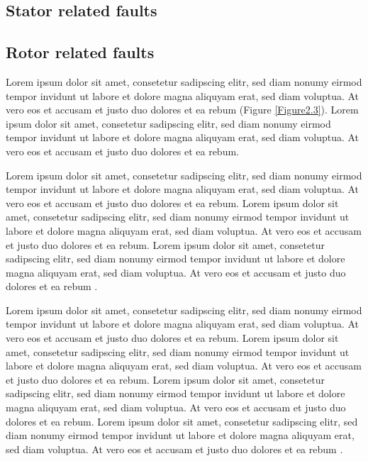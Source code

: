\subsection{Stator related faults}
\subsection{Rotor related faults}

Lorem ipsum dolor sit amet, consetetur sadipscing elitr, sed diam nonumy eirmod tempor invidunt ut labore et dolore magna aliquyam erat, sed diam voluptua. At vero eos et accusam et justo duo dolores et ea rebum (Figure \ref{Figure2.3}). Lorem ipsum dolor sit amet, consetetur sadipscing elitr, sed diam nonumy eirmod tempor invidunt ut labore et dolore magna aliquyam erat, sed diam voluptua. At vero eos et accusam et justo duo dolores et ea rebum. 

Lorem ipsum dolor sit amet, consetetur sadipscing elitr, sed diam nonumy eirmod tempor invidunt ut labore et dolore magna aliquyam erat, sed diam voluptua. At vero eos et accusam et justo duo dolores et ea rebum. Lorem ipsum dolor sit amet, consetetur sadipscing elitr, sed diam nonumy eirmod tempor invidunt ut labore et dolore magna aliquyam erat, sed diam voluptua. At vero eos et accusam et justo duo dolores et ea rebum. Lorem ipsum dolor sit amet, consetetur sadipscing elitr, sed diam nonumy eirmod tempor invidunt ut labore et dolore magna aliquyam erat, sed diam voluptua. At vero eos et accusam et justo duo dolores et ea rebum \cite{Deci_Ryan_1990}. 

Lorem ipsum dolor sit amet, consetetur sadipscing elitr, sed diam nonumy eirmod tempor invidunt ut labore et dolore magna aliquyam erat, sed diam voluptua. At vero eos et accusam et justo duo dolores et ea rebum. Lorem ipsum dolor sit amet, consetetur sadipscing elitr, sed diam nonumy eirmod tempor invidunt ut labore et dolore magna aliquyam erat, sed diam voluptua. At vero eos et accusam et justo duo dolores et ea rebum. Lorem ipsum dolor sit amet, consetetur sadipscing elitr, sed diam nonumy eirmod tempor invidunt ut labore et dolore magna aliquyam erat, sed diam voluptua. At vero eos et accusam et justo duo dolores et ea rebum. Lorem ipsum dolor sit amet, consetetur sadipscing elitr, sed diam nonumy eirmod tempor invidunt ut labore et dolore magna aliquyam erat, sed diam voluptua. At vero eos et accusam et justo duo dolores et ea rebum \cite{lepichon}.

\newenvironment{changemargin}[4]{
	\begin{list}{}{
			\setlength{\voffset}{#1}
			\setlength{\oddsidemargin}{#2}
			\setlength{\evensidemargin}{#3}
			\setlength{\textheight}{#3}
		}
		\item[] ~ \par
	}{
	\end{list}
}

